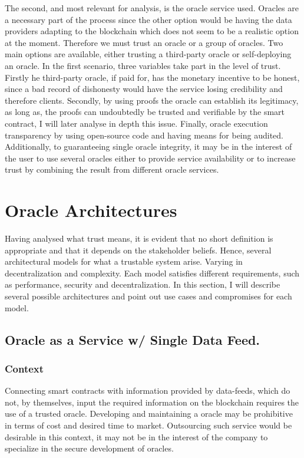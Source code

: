 The second, and most relevant for analysis, is the oracle service used. Oracles are a necessary part of the process since the other option would be having the data providers adapting to the blockchain which does not seem to be a realistic option at the moment. Therefore we must trust an oracle or a group of oracles. Two main options are available, either trusting a third-party oracle or self-deploying an oracle. In the first scenario, three variables take part in the level of trust. Firstly he third-party oracle, if paid for, has the monetary incentive to be honest, since a bad record of dishonesty would have the service losing credibility and therefore clients. Secondly, by using proofs the oracle can establish its legitimacy, as long as, the proofs can undoubtedly be trusted and verifiable by the smart contract, I will later analyse in depth this issue. Finally, oracle execution transparency by using open-source code and having means for being audited. Additionally, to guaranteeing single oracle integrity, it may be in the interest of the user to use several oracles either to provide service availability or to increase trust by combining the result from different oracle services.


\section{Oracle Architectures}

Having analysed what trust means, it is evident that no short definition is appropriate and that it depends on the stakeholder beliefs. Hence, several architectural models for what a trustable system arise. Varying in decentralization and complexity. Each model satisfies different requirements, such as performance, security and decentralization.
In this section, I will describe several possible architectures and point out use cases and compromises for each model.

\subsection{Oracle as a Service w/ Single Data Feed.}\label{OaaSwSingleDataFeed}

\subsubsection{Context}
Connecting smart contracts with information provided by data-feeds, which do not, by themselves, input the required information on the blockchain requires the use of a trusted oracle. Developing and maintaining a oracle may be prohibitive in terms of cost and desired time to market. Outsourcing such service would be desirable in this context, it may not be in the interest of the company to specialize in the secure development of oracles.

